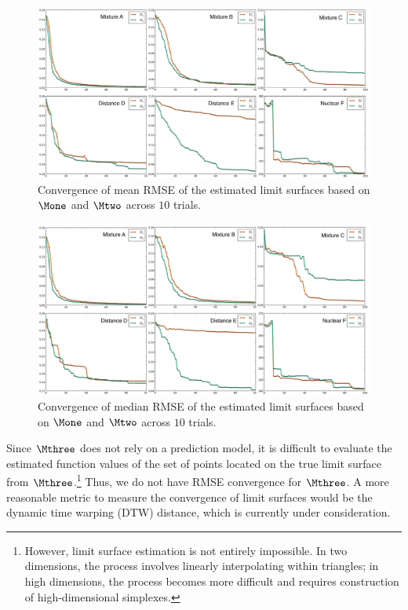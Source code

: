 \begin{figure}[!b]
\centering
\includegraphics[width=1.0\textwidth]{figs/chap5/RMSE-mean.pdf}
\caption{Convergence of mean RMSE of the estimated limit surfaces based on $\protect\Mone$ and $\protect\Mtwo$ across $10$ trials.}
\label{fig:RMSE-mean}
\end{figure}

\begin{figure}[ht]
\centering
\includegraphics[width=1.0\textwidth]{figs/chap5/RMSE-median.pdf}
\caption{Convergence of median RMSE of the estimated limit surfaces based on $\protect\Mone$ and $\protect\Mtwo$ across $10$ trials.}
\label{fig:RMSE-median}
\end{figure}

Since $\Mthree$ does not rely on a prediction model, it is difficult to evaluate the estimated function values of the set of points located on the true limit surface from $\Mthree$.\footnote{However, limit surface estimation is not entirely impossible. In two dimensions, the process involves linearly interpolating within triangles; in high dimensions, the process becomes more difficult and requires construction of high-dimensional simplexes.}
%
Thus, we do not have RMSE convergence for $\Mthree$.
%
A more reasonable metric to measure the convergence of limit surfaces would be the dynamic time warping (DTW) distance, which is currently under consideration.

